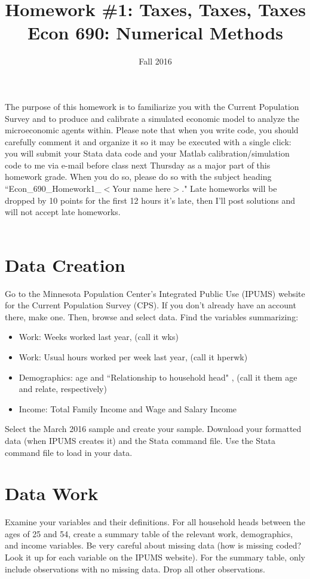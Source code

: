 \documentclass[11pt]{article}
\title{{\Large \bf Homework \#1: Taxes, Taxes, Taxes} \\ \small Econ 690: Numerical Methods}
\date{Fall 2016}
\begin{document}
\maketitle
 
\noindent
The purpose of this homework is to familiarize you with the Current Population Survey and to produce and calibrate a simulated economic model to analyze the microeconomic agents within.    Please note that when you write code, you should carefully comment it and organize it so it may be executed with a single click: you will submit your Stata data code and your Matlab calibration/simulation code to me via e-mail before class next Thursday as a major part of this homework grade.  When you do so, please do so with the subject heading ``Econ\_690\_Homework1\_$<$Your name here$>$."  Late homeworks will be dropped by 10 points for the first 12 hours it's late, then I'll post solutions and will not accept late homeworks.\\
\ \\

\section*{Data Creation}
Go to the Minnesota Population Center's Integrated Public Use (IPUMS) website for the Current Population Survey (CPS).  If you don't already have an account there, make one.  Then, browse and select data.  Find the variables summarizing:
\begin{itemize} 
\item Work: Weeks worked last year, (call it wks)
\item Work: Usual hours worked per week last year, (call it hperwk)
\item Demographics: age and ``Relationship to household head" , (call it them age and relate, respectively)
\item Income:  Total Family Income and Wage and Salary Income
\end{itemize}
Select the March 2016 sample and create your sample.  Download your formatted data (when IPUMS creates it) and the Stata command file.  Use the Stata command file to load in your data.

\section*{Data Work}
Examine your variables and their definitions.  For all household heads between the ages of 25 and 54, create a summary table of the relevant work, demographics, and income variables.  Be very careful about missing data (how is missing coded?  Look it up for each variable on the IPUMS website).  For the summary table, only include observations with no missing data.  Drop all other observations.  \ \\
\end{document}
